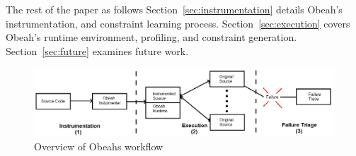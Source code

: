 
The rest of the paper as follows Section~\ref{sec:instrumentation} details
Obeah's instrumentation, and constraint learning process.
Section~\ref{sec:execution} covers Obeah's runtime environment, profiling, and
constraint generation. Section~\ref{sec:future} examines future work.

\begin{figure}[t]
    \includegraphics[width=\textwidth]{fig/obeah-system}%
    \caption{Overview of Obeahs workflow\label{fig:obeah-system}}%
\end{figure}
